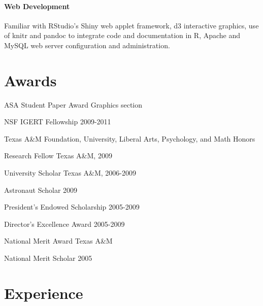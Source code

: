 \documentclass[10pt]{tccv}
\begin{document}
\paragraph{\textbf{Web Development}}
Familiar with RStudio's Shiny web applet framework, d3 interactive graphics, use of knitr and pandoc to integrate code and documentation in R, Apache and MySQL web server configuration and administration.\vspace{-6pt}

\section{Awards}
\begin{factlist}[leftmargin=.1cm,itemindent=.1cm,labelwidth=\itemindent,labelsep=.1cm]\itemsep-2pt
\item[ASA Student Paper Award] Graphics section
\item[NSF IGERT Fellowship] 2009-2011
\item[Texas A\&M] Foundation, University, Liberal Arts, Psychology, and Math Honors
\item[Research Fellow] Texas A\&M, 2009
\item[University Scholar] Texas A\&M, 2006-2009
\item[Astronaut Scholar] 2009
\item[President's Endowed Scholarship] 2005-2009
\item[Director's Excellence Award] 2005-2009
\item[National Merit Award] Texas A\&M
\item[National Merit Scholar] 2005
\end{factlist}

\section{Experience}
\end{document}
